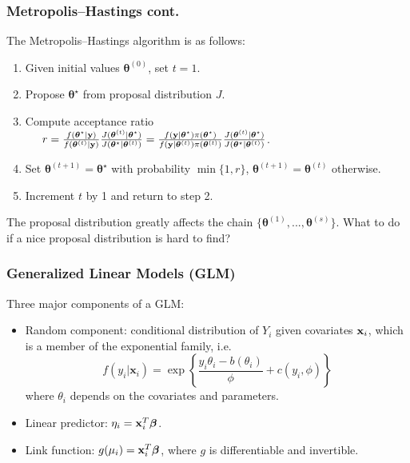 \documentclass[black]{beamer}
\begin{document}
\begin{frame}
\frametitle{Metropolis--Hastings cont.}
The Metropolis--Hastings algorithm is as follows:\vspace{0.2in}
\begin{enumerate}
\item Given initial values $\boldsymbol\theta^{(0)}$, set $t=1$.
\vspace{0.2cm}
\item Propose $\boldsymbol\theta^\star$ from proposal distribution $J$.
\vspace{0.2cm}
\item Compute acceptance ratio\\ $\hspace{0.2in} r = \frac{f(\boldsymbol\theta^\star | {\bf y})}{f(\boldsymbol\theta^{(t)}|{\bf y})}\frac{J(\boldsymbol\theta^{(t)}|\boldsymbol\theta^\star)}{J(\boldsymbol\theta^\star|\boldsymbol\theta^{(t)})} = \frac{f({\bf y}|\boldsymbol\theta^\star)\pi(\boldsymbol\theta^\star)}{f({\bf y}|\boldsymbol\theta^{(t)})\pi(\boldsymbol\theta^{(t)})}\frac{J(\boldsymbol\theta^{(t)}|\boldsymbol\theta^\star)}{J(\boldsymbol\theta^\star|\boldsymbol\theta^{(t)})}$.
\vspace{0.2cm}
\item Set $\boldsymbol\theta^{(t+1)} = \boldsymbol\theta^\star$ with probability $\min\{1,r\}$, $\boldsymbol\theta^{(t+1)} = \boldsymbol\theta^{(t)}$ otherwise.
\vspace{0.2cm}
\item Increment $t$ by 1 and return to step 2.
\end{enumerate}\vspace{0.2in}
The proposal distribution greatly affects the chain $\{\boldsymbol\theta^{(1)},...,\boldsymbol\theta^{(s)}\}$.  What to do if a nice proposal distribution is hard to find?
\end{frame}

\begin{frame}
\frametitle{Generalized Linear Models (GLM)}
Three major components of a GLM: \vspace{0.2in}
\begin{itemize}
\item Random component:  conditional distribution of $Y_i$ given covariates ${\bf x}_i$, which is a member of the exponential family, i.e.
\[
f(y_i|\mathbf{x}_i) = \exp\left\{\frac{y_i\theta_i - b(\theta_i)}{\phi} + c(y_i,\phi)\right\}
\]
where $\theta_i$ depends on the covariates and parameters.
\vspace{0.2cm}
\item Linear predictor:  $\eta_i = {\bf x}_i^T\boldsymbol\beta$.
\vspace{0.2cm}
\item Link function: $g(\mu_i) = {\bf x}_i^T\boldsymbol\beta$, where $g$ is differentiable and invertible.
\end{itemize}
\end{frame}
\end{document}
